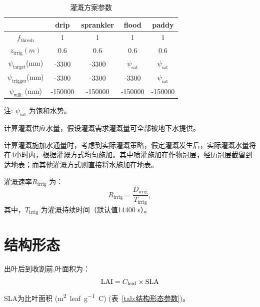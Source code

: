 \begin{table}[htbp]
  \centering
  \caption{灌溉方案参数}
  \label{tab:灌溉方案参数}
  \begin{threeparttable}
    \begin{tabular}{@{}ccccc}
      \toprule
                                    & drip    & sprankler & flood                 & paddy                 \\ \midrule
      $f_{\mathrm{thresh}}$         & 1       & 1         & 1                     & 1                     \\
      $z_{\mathrm{irrig}}(m)$       & 0.6     & 0.6       & 0.6                   & 0.6                   \\
      $\psi_{\mathrm{target}}$(mm)  & -3300   & -3300     & $\psi_{\mathrm{sat}}$ & $\psi_{\mathrm{sat}}$ \\
      $\psi_{\mathrm{trigger}}$(mm) & -3300   & -3300     & -3300                 & $\psi_{\mathrm{sat}}$ \\
      $\psi_{\mathrm{wilt}}$ (mm)   & -150000 & -150000   & -150000               & -150000               \\ \bottomrule
    \end{tabular}
    \begin{tablenotes}
      \footnotesize
    \item[注:] $\psi_{\mathrm{sat}}$ 为饱和水势。
    \end{tablenotes}
  \end{threeparttable}
\end{table}

计算灌溉供应水量，假设灌溉需求灌溉量可全部被地下水提供。

计算灌溉施加水通量时，考虑到实际灌溉策略，假定灌溉发生后，实际灌溉水量将在4小时内，根据灌溉方式均匀施加。其中喷灌施加在作物冠层，经历冠层截留到达地表；而其他灌溉方式则直接将水施加在地表。

灌溉速率$R_{\mathrm{irrig}}$ 为：
\begin{equation}
  R_{\mathrm{irrig}} = \frac{D_{\mathrm{irrig}}}{T_{\mathrm{irrig}}},
\end{equation}
其中，$T_{\mathrm{irrig}}$ 为灌溉持续时间（默认值14400 s）。
\section{结构形态}
出叶后到收割前,叶面积为：
\begin{equation}
  {\rm LAI}=C_{\mathrm{leaf}} \times {\rm SLA}
\end{equation}
SLA为比叶面积 (\unit{m^2.leaf.g^{-1}.C}) (表~\ref{tab:结构形态参数})。

